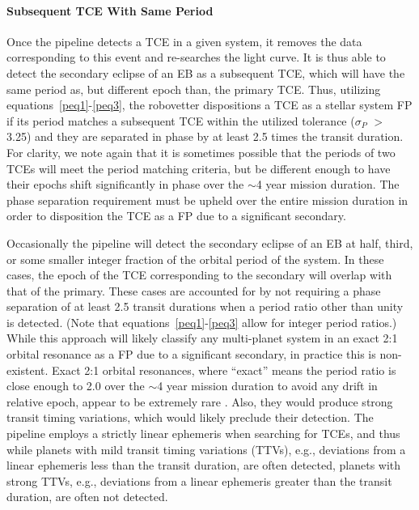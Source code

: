 \paragraph{Subsequent TCE With Same Period}
\label{s:secondTce}
Once the \kepler{} pipeline detects a TCE in a given system, it removes the data corresponding to this event and re-searches the light curve. It is thus able to detect the secondary eclipse of an EB as a subsequent TCE, which will have the same period as, but different epoch than, the primary TCE. Thus, utilizing equations~\ref{peq1}-\ref{peq3}, the robovetter dispositions a TCE as a stellar system FP if its period matches a subsequent TCE within the utilized tolerance ($\sigma_{P}$ $>$ 3.25) and they are separated in phase by at least 2.5 times the transit duration. For clarity, we note again that it is sometimes possible that the periods of two TCEs will meet the period matching criteria, but be different enough to have their epochs shift significantly in phase over the $\sim$4 year mission duration. The phase separation requirement must be upheld over the entire mission duration in order to disposition the TCE as a FP due to a significant secondary.  

Occasionally the \kepler{} pipeline will detect the secondary eclipse of an EB at half, third, or some smaller integer fraction of the orbital period of the system. In these cases, the epoch of the TCE corresponding to the secondary will overlap with that of the primary. These cases are accounted for by not requiring a phase separation of at least 2.5 transit durations when a period ratio other than unity is detected. (Note that equations~\ref{peq1}-\ref{peq3} allow for integer period ratios.) While this approach will likely classify any multi-planet system in an exact 2:1 orbital resonance as a FP due to a significant secondary, in practice this is non-existent. Exact 2:1 orbital resonances, where ``exact'' means the period ratio is close enough to 2.0 over the $\sim$4 year mission duration to avoid any drift in relative epoch, appear to be extremely rare \citep{Fabrycky2014}. Also, they would produce strong transit timing variations, which would likely preclude their detection. The \kepler{} pipeline employs a strictly linear ephemeris when searching for TCEs, and thus while planets with mild transit timing variations (TTVs), e.g., deviations from a linear ephemeris less than the transit duration, are often detected, planets with strong TTVs, e.g., deviations from a linear ephemeris greater than the transit duration, are often not detected.



